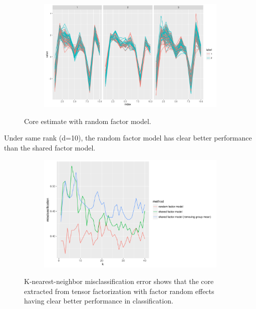 \documentclass[12pt]{article}
\newcommand{\bfi}{\begin{figure}[H]}
\newcommand{\efi}{\end{figure}}
\newcommand{\bsfi}{\begin{subfigure}[t]}
\newcommand{\esfi}{\end{subfigure}}
\begin{document}
\bfi
\centering
\bsfi{0.8\columnwidth}
\includegraphics[width=1\columnwidth]{../BatchEffectRemoval/batch_removal_data}
\esfi
\caption{Core estimate with random factor model.}
\efi

Under same rank (d=10), the random factor model has clear better performance than the shared factor model.

\bfi
\centering
\bsfi{0.8\columnwidth}
\includegraphics[width=1\columnwidth]{../BatchEffectRemoval/misclassification_data_knn}
\esfi
\caption{K-nearest-neighbor misclassification error shows that the core extracted from tensor factorization with factor random effects having clear better performance in classification.}
\efi



\end{document}
